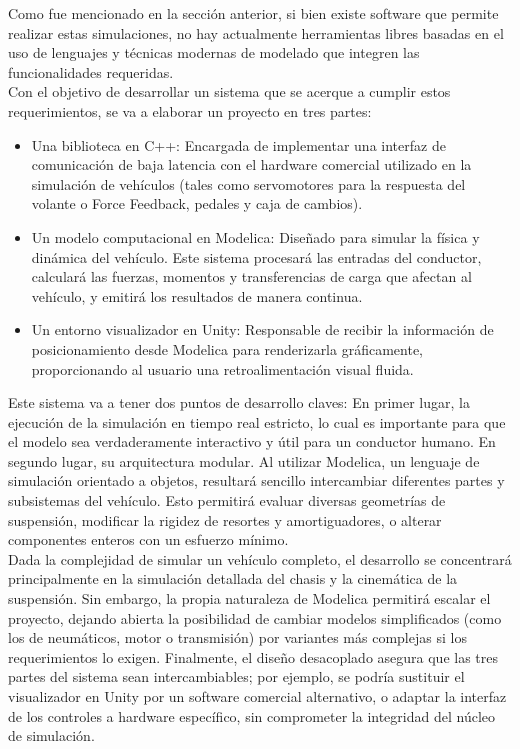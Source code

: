 Como fue mencionado en la sección anterior, si bien existe software que permite realizar estas simulaciones, no hay actualmente herramientas libres basadas en el uso de lenguajes y técnicas modernas de modelado que integren las funcionalidades requeridas. \\

Con el objetivo de desarrollar un sistema que se acerque a cumplir estos requerimientos, se va a elaborar un proyecto en tres partes:
\begin{itemize}
    \item Una biblioteca en C++: Encargada de implementar una interfaz de comunicación de baja latencia con el hardware comercial utilizado en la simulación de vehículos (tales como servomotores para la respuesta del volante o Force Feedback, pedales y caja de cambios).
    \item Un modelo computacional en Modelica: Diseñado para simular la física y dinámica del vehículo. Este sistema procesará las entradas del conductor, calculará las fuerzas, momentos y transferencias de carga que afectan al vehículo, y emitirá los resultados de manera continua.
    \item Un entorno visualizador en Unity: Responsable de recibir la información de posicionamiento desde Modelica para renderizarla gráficamente, proporcionando al usuario una retroalimentación visual fluida.
\end{itemize}
Este sistema va a tener dos puntos de desarrollo claves: En primer lugar, la ejecución de la simulación en tiempo real estricto, lo cual es importante para que el modelo sea verdaderamente interactivo y útil para un conductor humano. En segundo lugar, su arquitectura modular. Al utilizar Modelica, un lenguaje de simulación orientado a objetos, resultará sencillo intercambiar diferentes partes y subsistemas del vehículo. Esto permitirá evaluar diversas geometrías de suspensión, modificar la rigidez de resortes y amortiguadores, o alterar componentes enteros con un esfuerzo mínimo. \\
Dada la complejidad de simular un vehículo completo, el desarrollo se concentrará principalmente en la simulación detallada del chasis y la cinemática de la suspensión. Sin embargo, la propia naturaleza de Modelica permitirá escalar el proyecto, dejando abierta la posibilidad de cambiar modelos simplificados (como los de neumáticos, motor o transmisión) por variantes más complejas si los requerimientos lo exigen. Finalmente, el diseño desacoplado asegura que las tres partes del sistema sean intercambiables; por ejemplo, se podría sustituir el visualizador en Unity por un software comercial alternativo, o adaptar la interfaz de los controles a hardware específico, sin comprometer la integridad del núcleo de simulación.